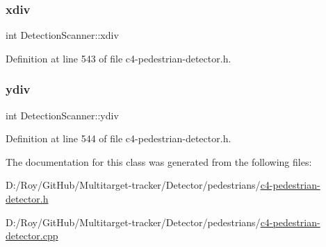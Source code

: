 \subsubsection{\texorpdfstring{xdiv}{xdiv}}
{\footnotesize\ttfamily int Detection\+Scanner\+::xdiv}



Definition at line 543 of file c4-\/pedestrian-\/detector.\+h.

\mbox{\label{class_detection_scanner_a78f38bf8d0990ad9ea8cea03ffe4a189}} 
\subsubsection{\texorpdfstring{ydiv}{ydiv}}
{\footnotesize\ttfamily int Detection\+Scanner\+::ydiv}



Definition at line 544 of file c4-\/pedestrian-\/detector.\+h.



The documentation for this class was generated from the following files\+:\begin{DoxyCompactItemize}
\item 
D\+:/\+Roy/\+Git\+Hub/\+Multitarget-\/tracker/\+Detector/pedestrians/\mbox{\hyperlink{c4-pedestrian-detector_8h}{c4-\/pedestrian-\/detector.\+h}}\item 
D\+:/\+Roy/\+Git\+Hub/\+Multitarget-\/tracker/\+Detector/pedestrians/\mbox{\hyperlink{c4-pedestrian-detector_8cpp}{c4-\/pedestrian-\/detector.\+cpp}}\end{DoxyCompactItemize}
